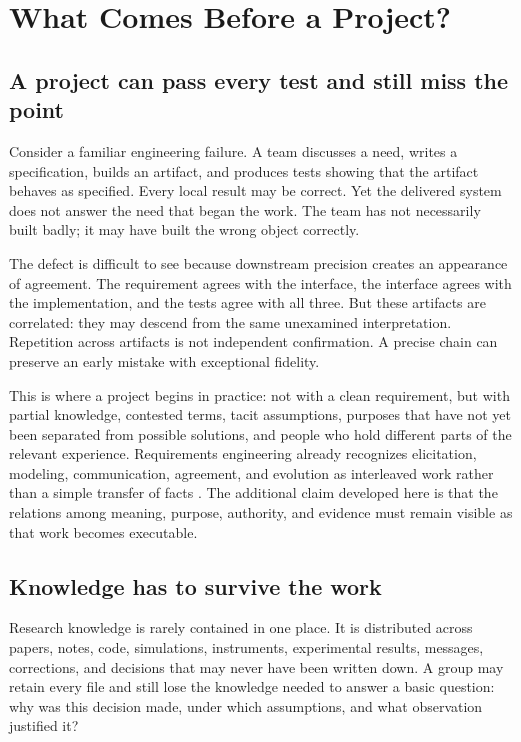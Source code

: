 \documentclass[10pt,a4paper]{article}
\begin{document}
\section{What Comes Before a Project?}

\subsection{A project can pass every test and still miss the point}

Consider a familiar engineering failure. A team discusses a need, writes a specification, builds an artifact, and produces tests showing that the artifact behaves as specified. Every local result may be correct. Yet the delivered system does not answer the need that began the work. The team has not necessarily built badly; it may have built the wrong object correctly.

The defect is difficult to see because downstream precision creates an appearance of agreement. The requirement agrees with the interface, the interface agrees with the implementation, and the tests agree with all three. But these artifacts are correlated: they may descend from the same unexamined interpretation. Repetition across artifacts is not independent confirmation. A precise chain can preserve an early mistake with exceptional fidelity.

This is where a project begins in practice: not with a clean requirement, but with partial knowledge, contested terms, tacit assumptions, purposes that have not yet been separated from possible solutions, and people who hold different parts of the relevant experience. Requirements engineering already recognizes elicitation, modeling, communication, agreement, and evolution as interleaved work rather than a simple transfer of facts \cite{nuseibeh2000}. The additional claim developed here is that the relations among meaning, purpose, authority, and evidence must remain visible as that work becomes executable.

\subsection{Knowledge has to survive the work}

Research knowledge is rarely contained in one place. It is distributed across papers, notes, code, simulations, instruments, experimental results, messages, corrections, and decisions that may never have been written down. A group may retain every file and still lose the knowledge needed to answer a basic question: why was this decision made, under which assumptions, and what observation justified it?
\end{document}
